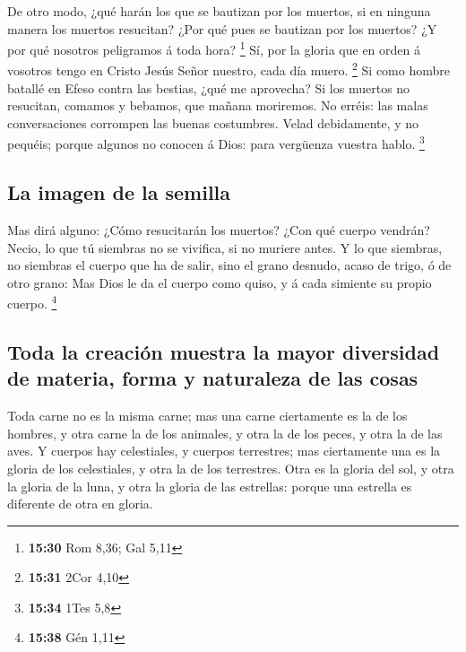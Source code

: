  De otro modo, ¿qué harán los que se bautizan por los
muertos, si en ninguna manera los muertos resucitan? ¿Por qué pues se
bautizan por los muertos?  ¿Y por qué nosotros peligramos
á toda hora? \footnote{\textbf{15:30} Rom 8,36; Gal 5,11}
 Sí, por la gloria que en orden á vosotros tengo en
Cristo Jesús Señor nuestro, cada día muero. \footnote{\textbf{15:31}
  2Cor 4,10}  Si como hombre batallé en Efeso contra las
bestias, ¿qué me aprovecha? Si los muertos no resucitan, comamos y
bebamos, que mañana moriremos.  No erréis: las malas
conversaciones corrompen las buenas costumbres.  Velad
debidamente, y no pequéis; porque algunos no conocen á Dios: para
vergüenza vuestra hablo. \footnote{\textbf{15:34} 1Tes 5,8}

\hypertarget{la-imagen-de-la-semilla}{%
\subsection{La imagen de la semilla}\label{la-imagen-de-la-semilla}}

 Mas dirá alguno: ¿Cómo resucitarán los muertos? ¿Con qué
cuerpo vendrán?  Necio, lo que tú siembras no se
vivifica, si no muriere antes.  Y lo que siembras, no
siembras el cuerpo que ha de salir, sino el grano desnudo, acaso de
trigo, ó de otro grano:  Mas Dios le da el cuerpo como
quiso, y á cada simiente su propio cuerpo. \footnote{\textbf{15:38} Gén
  1,11}

\hypertarget{toda-la-creaciuxf3n-muestra-la-mayor-diversidad-de-materia-forma-y-naturaleza-de-las-cosas}{%
\subsection{Toda la creación muestra la mayor diversidad de materia,
forma y naturaleza de las
cosas}\label{toda-la-creaciuxf3n-muestra-la-mayor-diversidad-de-materia-forma-y-naturaleza-de-las-cosas}}

 Toda carne no es la misma carne; mas una carne
ciertamente es la de los hombres, y otra carne la de los animales, y
otra la de los peces, y otra la de las aves.  Y cuerpos
hay celestiales, y cuerpos terrestres; mas ciertamente una es la gloria
de los celestiales, y otra la de los terrestres.  Otra es
la gloria del sol, y otra la gloria de la luna, y otra la gloria de las
estrellas: porque una estrella es diferente de otra en gloria.

